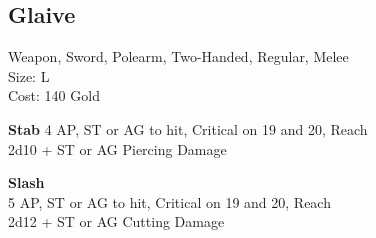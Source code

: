 \subsection{Glaive}\label{weapon:glaive}
Weapon, Sword, Polearm, Two-Handed, Regular, Melee\\
Size: L\\
Cost: 140 Gold

\textbf{Stab}
4 AP, ST or AG to hit, Critical on 19 and 20,  Reach\\
2d10 + \texttimes ST or AG Piercing Damage

\textbf{Slash}\\
5 AP, ST or AG to hit, Critical on 19 and 20,  Reach\\
2d12 + \texttimes ST or AG Cutting Damage


